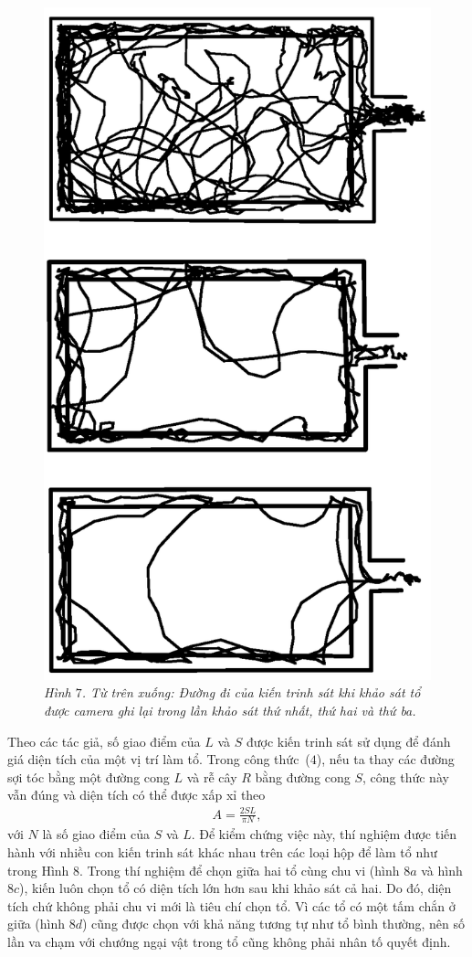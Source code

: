 \begin{multicols}{2}
	\begin{figure}[H]
		\vspace*{-5pt}
		\centering
		\captionsetup{labelformat= empty, justification=centering}
		\includegraphics[width=0.65\linewidth]{10}
		\caption{\small\textit{\color{toanhocdoisong}Hình $7$. Từ trên xuống: Đường đi của kiến trinh sát khi khảo sát tổ được camera ghi lại trong lần khảo sát thứ nhất, thứ hai và thứ ba.}}
		\vspace*{-10pt}
	\end{figure}
	Theo các tác giả, số giao điểm của $L$ và $S$ được kiến trinh sát sử dụng để đánh giá diện tích của một vị trí làm tổ. Trong công thức~($4$), nếu ta thay các đường sợi tóc bằng một đường cong $L$ và rễ cây $R$ bằng đường cong $S$, công thức này vẫn đúng và diện tích có thể được xấp xỉ theo 
	\begin{align*}
		A = \frac{2SL}{\pi N}, \tag{$5$}
	\end{align*}
	với $N$ là số giao điểm của $S$ và $L$.
	\vskip 0.1cm
	Để kiểm chứng việc này, thí nghiệm được tiến hành với nhiều con kiến trinh sát khác nhau trên các loại hộp để làm tổ như trong Hình $8$.
	\vskip 0.1cm
	Trong thí nghiệm để chọn giữa hai tổ cùng chu vi (hình $8a$ và hình $8c$), kiến luôn chọn tổ có diện tích lớn hơn sau khi khảo sát cả hai. Do đó, diện tích chứ không phải chu vi mới là tiêu chí chọn tổ. Vì các tổ có một tấm chắn ở giữa (hình $8d$) cũng được chọn với khả năng tương tự như tổ bình thường, nên số lần va chạm với chướng ngại vật trong tổ cũng không phải nhân tố quyết định.

\end{multicols}
